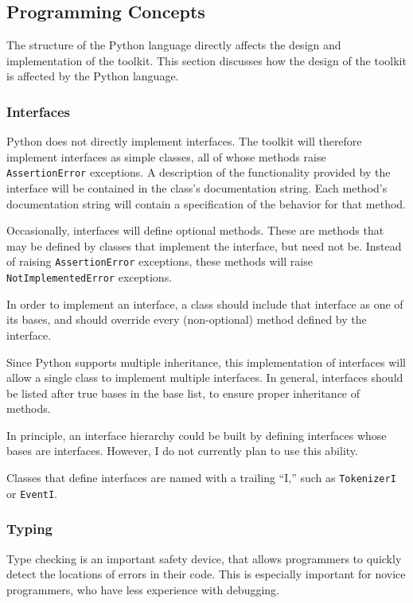 \documentclass{article}
\begin{document}
\subsection{Programming Concepts}

The structure of the Python language directly affects the design and
implementation of the toolkit.  This section discusses how the design
of the toolkit is affected by the Python language.

\subsubsection{Interfaces}

Python does not directly implement interfaces.  The toolkit will
therefore implement interfaces as simple classes, all of whose methods 
raise \texttt{AssertionError} exceptions.  A description of the
functionality provided by the interface will be contained in the
class's documentation string.  Each method's documentation string will 
contain a specification of the behavior for that method.

Occasionally, interfaces will define optional methods.  These are
methods that may be defined by classes that implement the interface,
but need not be.  Instead of raising \texttt{AssertionError}
exceptions, these methods will raise \texttt{NotImplementedError}
exceptions. 

In order to implement an interface, a class should include that
interface as one of its bases, and should override every
(non-optional) method defined by the interface.

Since Python supports multiple inheritance, this implementation of
interfaces will allow a single class to implement multiple
interfaces.  In general, interfaces should be listed after true bases
in the base list, to ensure proper inheritance of methods.

In principle, an interface hierarchy could be built by defining
interfaces whose bases are interfaces.  However, I do not currently
plan to use this ability.

Classes that define interfaces are named with a trailing ``I,'' such
as \texttt{TokenizerI} or \texttt{EventI}.

\subsubsection{Typing}

Type checking is an important safety device, that allows programmers to
quickly detect the locations of errors in their code.  This is
especially important for novice programmers, who have less experience
with debugging.  
\end{document}
